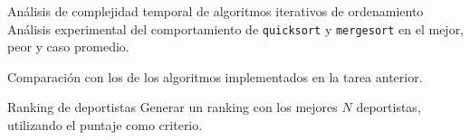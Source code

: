 \begin{taskdone}{Análisis de complejidad temporal de algoritmos iterativos de ordenamiento}
    Análisis experimental del comportamiento de \texttt{quicksort} y \texttt{mergesort} en el mejor, peor y caso promedio.
    
    Comparación con los de los algoritmos implementados en la tarea anterior.
\end{taskdone}

\begin{taskdone}{Ranking de deportistas}
    Generar un ranking con los mejores $N$ deportistas, utilizando el puntaje como criterio.
\end{taskdone}